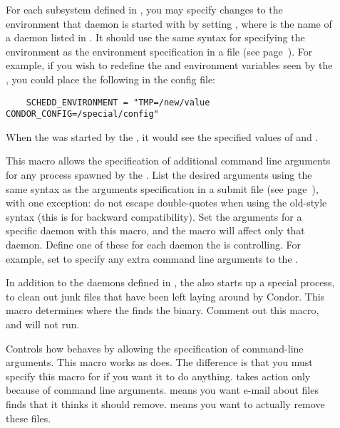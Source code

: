 \begin{description}
\item[] \label{param:DaemonNameEnvironment}
  For each subsystem defined in , you may specify
  changes to the environment that daemon is started with by setting
  , where  is the name of
  a daemon listed in . It should use the same syntax
  for specifying the environment as the environment specification in
  a  file (see page~\pageref{man-condor-submit-environment}).
  For example, if you wish to redefine the
   and  environment variables seen by the
  , you could place the following in the config file:
  \begin{verbatim}
    SCHEDD_ENVIRONMENT = "TMP=/new/value CONDOR_CONFIG=/special/config"
  \end{verbatim}
  When the  was started by the , it would
  see the specified values of  and .

\item[] \label{param:SubsysArgs} This macro allows
  the specification of additional command line arguments for any
  process spawned by the .  List the desired arguments
  using the same syntax as the arguments specification in a
   submit file (see
  page~\pageref{man-condor-submit-arguments}), with one exception: do
  not escape double-quotes when using the old-style syntax (this is
  for backward compatibility).  Set the arguments for a specific
  daemon with this macro, and the macro will affect only that
  daemon. Define one of these for each daemon the  is
  controlling.  For example, set  to specify
  any extra command line arguments to the .

\item[] \label{param:Preen} In addition to the daemons
  defined in , the  also starts up
  a special process,  to clean out junk files that have
  been left laying around by Condor.  This macro determines where the
   finds the  binary.
  Comment out this macro, and  will not run.

\item[] \label{param:PreenArgs}
  Controls how  behaves by allowing the specification
  of command-line arguments.
  This macro works as  does.
  The difference is that you must specify this macro for
   if you want it to do anything.
   takes action only
  because of command line arguments.
   means you want e-mail about files  finds that it
  thinks it should remove.
   means you want  to actually remove these files.


\end{description}
